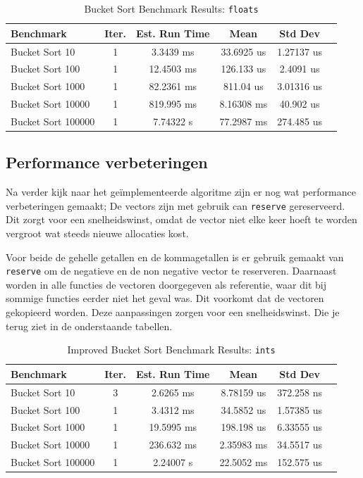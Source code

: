 \documentclass{article}
\begin{document}
\begin{table}[H]
  \caption{Bucket Sort Benchmark Results:  \texttt{floats}\label{tab:floats-detailed}}
  \begin{tabular*}{\columnwidth}{@{\extracolsep\fill}lccccc}
    \hline
    Benchmark  & Iter. & Est. Run Time & Mean          & Std Dev       \\
    \hline
    Bucket Sort 10     & 1 & 3.3439  ms  & 33.6925 us  & 1.27137  us  \\
    Bucket Sort 100    & 1 & 12.4503 ms & 126.133  us  & 2.4091  us   \\
    Bucket Sort 1000   & 1 & 82.2361 ms & 811.04   us  & 3.01316 us  \\
    Bucket Sort 10000  & 1 & 819.995 ms & 8.16308  ms  & 40.902  us   \\
    Bucket Sort 100000 & 1 & 7.74322 s  & 77.2987  ms  & 274.485 us  \\
    \hline
  \end{tabular*}
\end{table}

\vspace{1em}
\subsection*{Performance verbeteringen}
Na verder kijk naar het geïmplementeerde algoritme zijn er nog wat performance verbeteringen gemaakt;
De vectors zijn met gebruik can \texttt{reserve} gereserveerd. Dit zorgt voor een snelheidswinst, omdat de vector niet elke keer hoeft te worden vergroot wat steeds nieuwe allocaties kost.

Voor beide de gehelle getallen en de kommagetallen is er gebruik gemaakt van \texttt{reserve} om de negatieve en de non negative vector te reserveren. 
Daarnaast worden in alle functies de vectoren doorgegeven als referentie, waar dit bij sommige functies eerder niet het geval was. Dit voorkomt dat de vectoren gekopieerd worden. 
Deze aanpassingen zorgen voor een snelheidswinst. Die je terug ziet in de onderstaande tabellen.

\begin{table}[H]
  \caption{Improved Bucket Sort Benchmark Results:  \texttt{ints}}
  \label{tab:ints-detailed-new}
  \begin{tabular*}{\columnwidth}{@{\extracolsep\fill}lccccc}
    \hline
    Benchmark          & Iter. & Est. Run Time & Mean          & Std Dev       \\
    \hline
    Bucket Sort 10     & 3     & 2.6265 ms    & 8.78159 us    & 372.258 ns  \\
    Bucket Sort 100    & 1     & 3.4312 ms    & 34.5852 us    & 1.57385 us  \\
    Bucket Sort 1000   & 1     & 19.5995 ms   & 198.198 us    & 6.33555 us  \\
    Bucket Sort 10000  & 1     & 236.632 ms   & 2.35983 ms    & 34.5517 us  \\
    Bucket Sort 100000 & 1     & 2.24007 s    & 22.5052 ms    & 152.575 us  \\
    \hline
  \end{tabular*}
\end{table}
\end{document}

